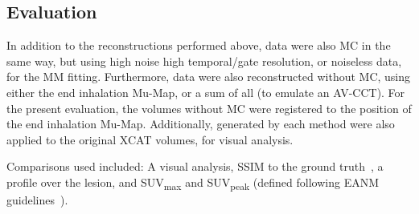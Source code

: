     \vspace{-0.5cm}
    
    \subsection{Evaluation} \label{sec:evaluation}
        In addition to the reconstructions performed %
        above, data were also \gls{MC} in the same way, %
        but using high noise high temporal/gate resolution, or noiseless data, for the \gls{MM} fitting. Furthermore, data were also reconstructed without \gls{MC}, using either the end inhalation \gls{Mu-Map}, or a sum of all  (to emulate an \gls{AV-CCT}). For the present evaluation, the volumes without \gls{MC} were registered to the position of the end inhalation \gls{Mu-Map}. Additionally,  generated by each method were also applied to the original \acrshort{XCAT} volumes, for visual analysis.
        
        Comparisons used included: A visual analysis, \acrshort{SSIM} to the ground truth~\cite{Wang2009MeanMeasures}, a profile over the lesion, and \acrshort{SUV}\textsubscript{max} and \acrshort{SUV}\textsubscript{peak} (defined following \acrshort{EANM} guidelines~\cite{Boellaard2015FDG2.0}).

\vspace{-0.5cm}

